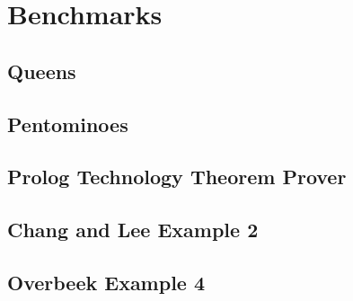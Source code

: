 \chapter{Benchmarks}
\label{benchmarks}

\section{Queens}

\section{Pentominoes}

\section{Prolog Technology Theorem Prover}

\section{Chang and Lee Example 2}

\section{Overbeek Example 4}
